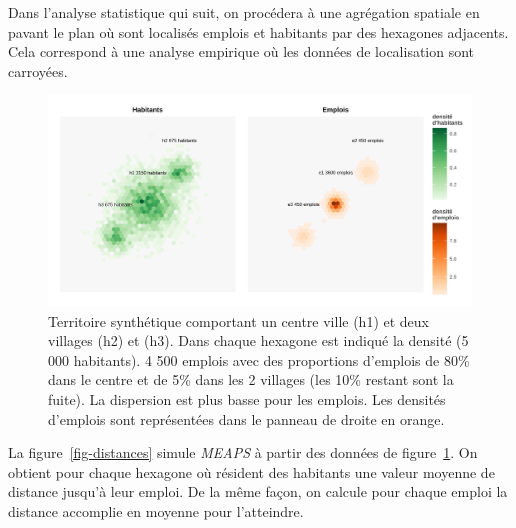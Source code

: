 \documentclass[
  10pt,
  a4paper,
  numbers=noendperiod,
  DIV=9]{scrreprt}
\begin{document}
Dans l'analyse statistique qui suit, on procédera à une agrégation
spatiale en pavant le plan où sont localisés emplois et habitants par
des hexagones adjacents. Cela correspond à une analyse empirique où les
données de localisation sont carroyées.

\begin{figure}[htb]

{\centering \includegraphics[width=1\textwidth,height=\textheight]{./output/gcarte_ss.png}

}

\caption[Territoire synthétique (centre + 2
villages)]{\label{fig-territoire}Territoire synthétique comportant un
centre ville (h1) et deux villages (h2) et (h3). Dans chaque hexagone
est indiqué la densité (5 000 habitants). 4 500 emplois avec des
proportions d'emplois de 80\% dans le centre et de 5\% dans les 2
villages (les 10\% restant sont la fuite). La dispersion est plus basse
pour les emplois. Les densités d'emplois sont représentées dans le
panneau de droite en orange.}

\end{figure}

La figure~\ref{fig-distances} simule \emph{MEAPS} à partir des données
de figure~\ref{fig-territoire}. On obtient pour chaque hexagone où
résident des habitants une valeur moyenne de distance jusqu'à leur
emploi. De la même façon, on calcule pour chaque emploi la distance
accomplie en moyenne pour l'atteindre.
\end{document}
